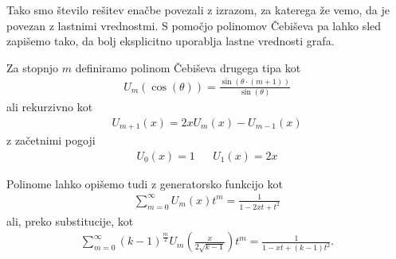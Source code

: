 Tako smo število rešitev enačbe povezali z izrazom, za katerega že vemo, da je povezan z lastnimi vrednostmi. S pomočjo polinomov Čebiševa pa lahko sled zapišemo tako, da bolj eksplicitno uporablja lastne vrednosti grafa.
\begin{definicija}
    Za stopnjo \(m\) definiramo polinom Čebiševa drugega tipa kot 
    \begin{align*}
        U_m(\cos(\theta)) = \frac{\sin(\theta\cdot(m+1))}{\sin(\theta)}
    \end{align*}
    ali rekurzivno kot
    \begin{align*}
        U_{m+1}(x) = 2xU_m(x) - U_{m-1}(x)
    \end{align*}
    z začetnimi pogoji
    \begin{align*}
        U_0(x) = 1 && U_1(x)=2x
    \end{align*}
\end{definicija}
Polinome lahko opišemo tudi z generatorsko funkcijo kot
\begin{align*}
    \sum_{m=0}^{\infty} U_m(x)t^m = \frac{1}{1-2xt+t^2}
\end{align*}
ali, preko substitucije, kot
\begin{align*}
    \sum_{m=0}^{\infty} (k-1)^{\frac{m}{2}}U_m\left(\frac{x}{2\sqrt{k-1}}\right)t^m = \frac{1}{1-xt+(k-1)t^2}.
\end{align*}

